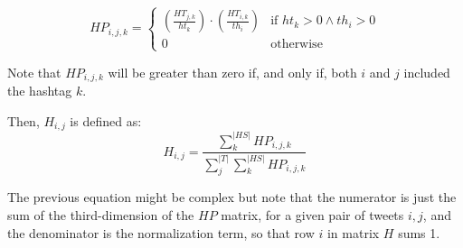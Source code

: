 \begin{equation}
HP_{i,j,k} = \begin{cases}
\left( \frac{ HT_{j,k} }{ ht_k } \right) \cdot \left( \frac{ HT_{i,k} }{ th_i } \right) & \text{if } ht_k > 0 \wedge th_i > 0 \\
0 & \text{otherwise}
\end{cases}
\end{equation}

Note that $HP_{i,j,k}$ will be greater than zero if, and only if, both $i$ and $j$ included the hashtag $k$. 

Then, $H_{i,j}$ is defined as:
\begin{equation}
H_{i,j} = \frac{\sum^{|HS|}_{k} HP_{i,j,k}}{ \sum^{|T|}_j \sum^{|HS|}_{k} HP_{i,j,k}}
\end{equation}

The previous equation might be complex but note that the numerator is just the sum of the third-dimension of the $HP$ matrix, for a given pair of tweets $i, j$, and the denominator is the normalization term, so that row $i$ in matrix $H$ sums 1.

